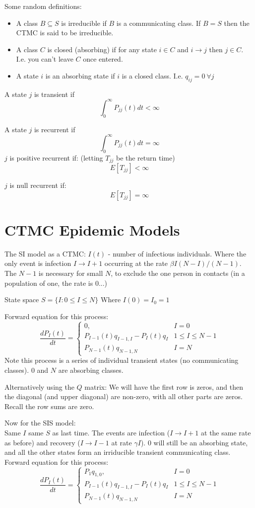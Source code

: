 \documentclass{X:/Documents/Coding/Latex/myassignment}
\begin{document}
Some random definitions:
\begin{itemize}
    \item A class $B \subseteq S$ is irreducible if $B$ is a communicating class. If $B = S$ then the CTMC is said to be irreducible.
    \item A class $C$ is closed (absorbing) if for any state $i\in C$ and $i \to j$ then $j \in C$. I.e. you can't leave $C$ once entered.
    \item A state $i$ is an absorbing state if $i$ is a closed class. I.e. $q_{ij} = 0 \ \forall j$
\end{itemize}

A state $j$ is transient if
\[\int_0^\infty P_{jj}(t) dt < \infty\]


A state $j$ is recurrent if
\[\int_0^\infty P_{jj}(t) dt = \infty\]
$j$ is positive recurrent if: (letting $T_{jj}$ be the return time)
\[E[T_{jj}] < \infty \]

$j$ is null recurrent if:
\[E[T_{jj}] = \infty\]


\section{CTMC Epidemic Models}
The SI model as a CTMC:
$I(t)$ - number of infectious individuals. Where the only event is infection $I\to I+1$ occurring at the rate $\beta I(N-I)/(N-1)$. The $N-1$ is necessary for small $N$, to exclude the one person in contacts (in a population of one, the rate is 0...)

State space $S = \{I : 0\leq I \leq N\}$ Where $I(0) = I_0 = 1$

Forward equation for this process:
\[\frac{dP_I(t)}{dt} = \begin{cases}
0,& I=0\\
P_{I-1}(t)q_{I-1,I} - P_{I}(t) q_{I}& 1\leq I \leq N-1\\
P_{N-1}(t) q_{N-1,N}& I=N
\end{cases}\]
Note this process is a series of individual transient states (no communicating classes). $0$ and $N$ are absorbing classes.

Alternatively using the $Q$ matrix:
We will have the first row is zeros, and then the diagonal (and upper diagonal) are non-zero, with all other parts are zeros.
Recall the row sums are zero.

Now for the SIS model:\\
Same $I$ same $S$ as last time. The events are infection ($I\to I+1$ at the same rate as before) and recovery ($I\to I-1$ at rate $\gamma I$). $0$ will still be an absorbing state, and all the other states form an irriducible transient communicating class.
Forward equation for this process:
\[\frac{dP_I(t)}{dt} = \begin{cases}
P_{1} q_{1,0},& I=0\\
P_{I-1}(t)q_{I-1,I} - P_{I}(t) q_{I}& 1\leq I \leq N-1\\
P_{N-1}(t) q_{N-1,N}& I=N
\end{cases}\]
\end{document}
